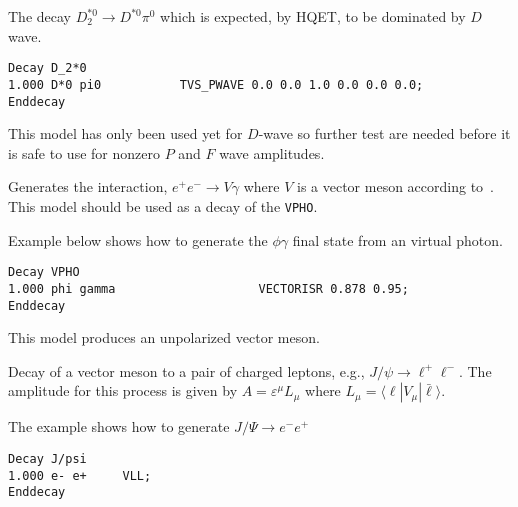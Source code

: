 \Example
The decay $D_2^{*0}\rightarrow D^{*0} \pi^0$ which is expected, 
by HQET, to be dominated by $D$ wave.
\begin{verbatim}
Decay D_2*0
1.000 D*0 pi0           TVS_PWAVE 0.0 0.0 1.0 0.0 0.0 0.0;
Enddecay
\end{verbatim}

\Notes
This model has only been used yet for $D$-wave so
further test are needed before it is safe to use for nonzero
$P$ and $F$ wave amplitudes.





\label{vectorisr}



\Expl
Generates the interaction, $e^+ e^- \rightarrow V \gamma$ where $V$
is a vector meson according
to~\cite{Bonn71}. This model should be used as a decay of the {\tt VPHO}.

\Example
Example below shows how to generate the $\phi\gamma$ final state from
an virtual photon.
\begin{verbatim}
Decay VPHO
1.000 phi gamma                    VECTORISR 0.878 0.95;
Enddecay
\end{verbatim}

\Notes
This model produces an unpolarized vector meson.




\label{vll}



\Expl
Decay of a vector meson to a pair of charged leptons, e.g., 
$J/\psi\rightarrow\ell^+\ell^-$. The amplitude for this
process is given by $A=\varepsilon^{\mu}L_{\mu}$ where
$L_{\mu}=\langle \ell | V_{\mu} | \bar\ell \rangle$.

\Example
The example shows how to generate $J/\Psi \rightarrow e^-e^+$
\begin{verbatim}
Decay J/psi
1.000 e- e+     VLL;
Enddecay
\end{verbatim}











\label{vsppwave}


